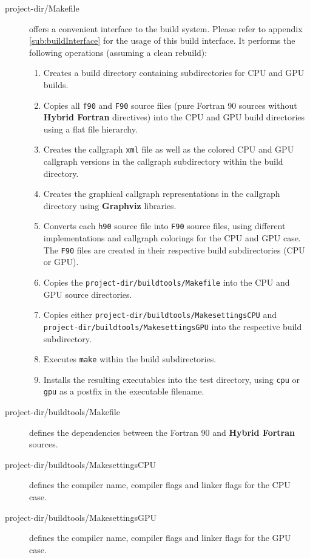 \begin{description}
 \item[project-dir/Makefile] offers a convenient interface to the build system. Please refer to appendix \ref{sub:buildInterface} for the usage of this build interface. It performs the following operations (assuming a clean rebuild):
 \begin{enumerate}
  \item Creates a build directory containing subdirectories for CPU and GPU builds.
  \item Copies all \verb|f90| and \verb|F90| source files (pure Fortran 90 sources without \textbf{Hybrid Fortran} directives) into the CPU and GPU build directories using a flat file hierarchy.
  \item Creates the callgraph \verb|xml| file as well as the colored CPU and GPU callgraph versions in the callgraph subdirectory within the build directory.
  \item Creates the graphical callgraph representations in the callgraph directory using \textbf{Graphviz} libraries.
  \item Converts each \verb|h90| source file into \verb|F90| source files, using different implementations and callgraph colorings for the CPU and GPU case. The \verb|F90| files are created in their respective build subdirectories (CPU or GPU).
  \item Copies the \verb|project-dir/buildtools/Makefile| into the CPU and GPU source directories.
  \item Copies either \verb|project-dir/buildtools/MakesettingsCPU| and \linebreak
    \verb|project-dir/buildtools/MakesettingsGPU| into the respective build subdirectory.
  \item Executes \verb|make| within the build subdirectories.
  \item Installs the resulting executables into the test directory, using \verb|cpu| or \verb|gpu| as a postfix in the executable filename.
 \end{enumerate}
 \item[project-dir/buildtools/Makefile] defines the dependencies between the Fortran 90 and \textbf{Hybrid Fortran} sources.
 \item[project-dir/buildtools/MakesettingsCPU] defines the compiler name, compiler flags and linker flags for the CPU case.
 \item[project-dir/buildtools/MakesettingsGPU] defines the compiler name, compiler flags and linker flags for the GPU case.
\end{description}

